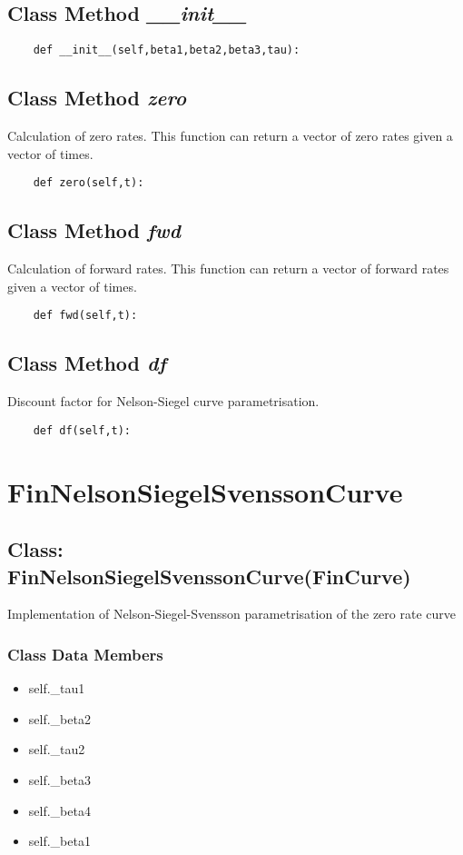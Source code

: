 \documentclass[twoside,11pt]{book}
\begin{document}
\subsection{Class Method {\it \_\_init\_\_}}


\begin{lstlisting}
    def __init__(self,beta1,beta2,beta3,tau):
\end{lstlisting}

\subsection{Class Method {\it zero}}
Calculation of zero rates. This function can return a vector of zero rates given a vector of times. 

\begin{lstlisting}
    def zero(self,t):
\end{lstlisting}

\subsection{Class Method {\it fwd}}
Calculation of forward rates. This function can return a vector of forward rates given a vector of times. 

\begin{lstlisting}
    def fwd(self,t):
\end{lstlisting}

\subsection{Class Method {\it df}}
Discount factor for Nelson-Siegel curve parametrisation. 

\begin{lstlisting}
    def df(self,t):
\end{lstlisting}

\newpage
\section{FinNelsonSiegelSvenssonCurve}

\subsection{Class: FinNelsonSiegelSvenssonCurve(FinCurve)}
Implementation of Nelson-Siegel-Svensson parametrisation of the zero rate curve 

\subsubsection{Class Data Members}
\begin{itemize}
\item{self.\_tau1}
\item{self.\_beta2}
\item{self.\_tau2}
\item{self.\_beta3}
\item{self.\_beta4}
\item{self.\_beta1}
\end{itemize}
\end{document}
